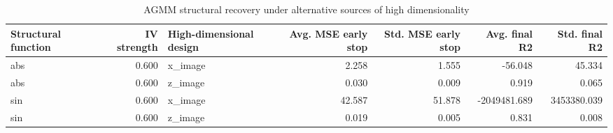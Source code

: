\begin{table}
\caption{AGMM structural recovery under alternative sources of high dimensionality}
\label{tab:agmm_high_dimensionality_summary}
\begin{tabular}{lrlrrrr}
\toprule
Structural function & IV strength & High-dimensional design & Avg. MSE early stop & Std. MSE early stop & Avg. final R2 & Std. final R2 \\
\midrule
abs & 0.600 & x_image & 2.258 & 1.555 & -56.048 & 45.334 \\
abs & 0.600 & z_image & 0.030 & 0.009 & 0.919 & 0.065 \\
sin & 0.600 & x_image & 42.587 & 51.878 & -2049481.689 & 3453380.039 \\
sin & 0.600 & z_image & 0.019 & 0.005 & 0.831 & 0.008 \\
\bottomrule
\end{tabular}
\end{table}
